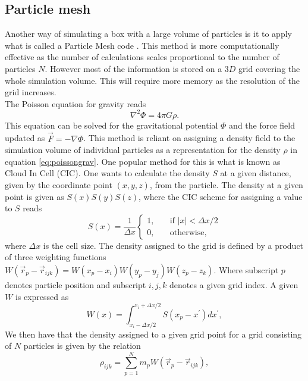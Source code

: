 \subsection{Particle mesh}
Another way of simulating a box with a large volume of particles is it to apply
what is called a Particle Mesh code \cite{HockneyRW1981Csup} \cite{Fazio2309855}. This method is more computationally
effective as the number of calculations scales proportional to the number of particles $N$. However most of
the information is stored on a $3D$ grid covering the whole simulation volume.
This will require more memory as the resolution of the grid increases.\\\indent
The Poisson equation for gravity reads
\begin{equation}\label{eq:poissongrav}
    \nabla^2\Phi=4\pi G\rho.
\end{equation}
This equation can be solved for the gravitational potential $\Phi$ and
the force field updated as $\vec{F}=-\nabla\Phi$. This method is reliant on assigning a
density field to the simulation volume of individual particles as a
representation for the density $\rho$ in equation \ref{eq:poissongrav}. One popular method 
for this is what is known as Cloud In Cell (CIC). One wants to calculate the density $S$ at a given
distance, given by the coordinate point $(x, y, z)$, from the particle. The density at a given point is given as
$S(x)S(y)S(z)$, where the CIC scheme for assigning a value to $S$
reads
\begin{equation}
    S(x)=\frac{1}{\Delta x}
    \begin{cases}
        1, &\quad\text{if }\vert x \vert < \Delta x/2\\
        0, &\quad\text{otherwise},
      \end{cases}
\end{equation}
where $\Delta x$ is the cell size. The density assigned to the grid is defined
by a product of three weighting functions $W(\vec{r}_p -\vec{r}_{ijk}) =
W(x_p-x_i)W(y_p-y_j)W(z_p-z_k)$. Where subscript $p$ denotes particle position
and subscript $i,j,k$ denotes a given grid index. A given $W$ is expressed as
\begin{equation}
    W(x)=\int_{x_i-\Delta x/2}^{x_i+\Delta x/2} S(x_p - x^\prime)dx^\prime,
\end{equation}
We then have that the density assigned to a given grid point for a grid
consisting of $N$ particles is given by the relation
\begin{equation}
    \rho_{ijk}=\sum_{p=1}^Nm_pW(\vec{r}_p-\vec{r}_{ijk}),
\end{equation}

